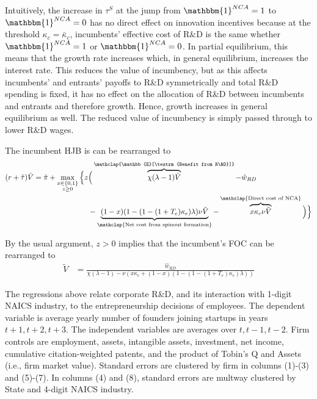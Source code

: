 Intuitively, the increase in $\tau^S$ at the jump from $\mathbbm{1}^{NCA} = 1$ to $\mathbbm{1}^{NCA} = 0$ has no direct effect on innovation incentives because at the threshold $\kappa_c = \bar{\kappa}_c$, incumbents' effective cost of R\&D is the same whether $\mathbbm{1}^{NCA} = 1$ or $\mathbbm{1}^{NCA} = 0$. In partial equilibrium, this means that the growth rate increases which, in general equilibrium, increases the interest rate. This reduces the value of incumbency, but as this affects incumbents' and entrants' payoffs to R\&D symmetrically and total R\&D spending is fixed, it has no effect on the allocation of R\&D between incumbents and entrants and therefore growth. Hence, growth increases in general equilibrium as well. The reduced value of incumbency is simply passed through to lower R\&D wages.




The incumbent HJB is can be rearranged to
\begin{align}
(r + \hat{\tau}) \tilde{V} = \tilde{\pi} + \max_{\substack{x \in \{0,1\} \\ z \ge 0}} \Big\{z &\Big( \overbrace{\chi (\lambda - 1) \tilde{V}}^{\mathclap{\mathbb{E}[\textrm{Benefit from R\&D}]}}- \hat{w}_{RD} \\
&-  \underbrace{(1-x)(1 - (1-(1+T_e)\kappa_{e})\lambda)\nu \tilde{V}}_{\mathclap{\text{Net cost from spinout formation}}} - \overbrace{x \kappa_{c} \nu \tilde{V}}^{\mathclap{\text{Direct cost of NCA}}}\Big) \Big\} \label{eq:hjb_incumbent_entryTax_2}
\end{align}

By the usual argument, $z > 0$ implies that the incumbent's FOC can be rearranged to
\begin{align}
\tilde{V} &= \frac{\hat{w}_{RD}}{\chi(\lambda -1) - \nu (x\kappa_c + (1-x)(1 - (1-(1+T_e)\kappa_e)\lambda)) } \label{eq:hjb_incumbent_foc_entryTax}
\end{align}







\begin{table}[!htb]
	\scriptsize
	\centering
	
	\caption{The regressions above relate corporate R\&D, and its interaction with 1-digit NAICS industry, to the  entrepreneurship decisions of employees. The dependent variable is average yearly number of founders joining startups in years $t+1,t+2,t+3$. The independent variables are averages over $t,t-1,t-2$. Firm controls are employment, assets, intangible assets, investment, net income, cumulative citation-weighted patents, and the product of Tobin's Q and Assets (i.e., firm market value). Standard errors are clustered by firm in columns (1)-(3) and (5)-(7). In columns (4) and (8), standard errors are multway clustered by State and 4-digit NAICS industry.}
	\label{table:RDandSpinoutFormation_absolute_founder2_hNCA_l3f3}
\end{table}


